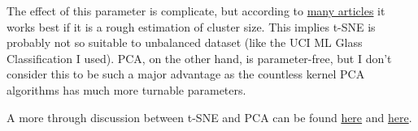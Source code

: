 \documentclass[11pt]{article}
\begin{document}
The effect of this parameter is complicate, but according to \href{https://distill.pub/2016/misread-tsne/}{many articles} it works best if it is a rough estimation of cluster size. This implies t-SNE is probably not so suitable to unbalanced dataset (like the UCI ML Glass Classification I used). PCA, on the other hand, is parameter-free, but I don't consider this to be such a major advantage as the countless kernel PCA algorithms has much more turnable parameters.\newline

A more through discussion between t-SNE and PCA can be found \href{https://stats.stackexchange.com/questions/238538/are-there-cases-where-pca-is-more-suitable-than-t-sne}{here} and \href{https://stats.stackexchange.com/questions/263539/clustering-on-the-output-of-t-sne}{here}.
\end{document}
